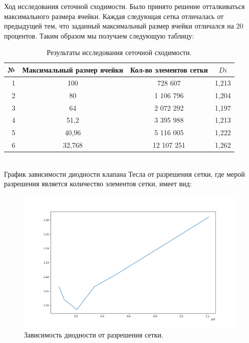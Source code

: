 \documentclass[14pt,a4paper]{article}
\begin{document}
        Ход исследования сеточной сходимости. Было принято решение отталкиваться максимального размера ячейки. Каждая следующая сетка отличалась от предыдущей тем, что заданный максимальный размер ячейки отличался на 20 процентов. Таким образом мы получаем следующую таблицу: 
        \\
        \begin{table}[!htb]
            \begin{center}
                \caption{Результаты исследования сеточной сходимости.}
                \begin{tabular}{rccc}                 
                    \hline
                    №      & Максимальный размер ячейки & Кол-во элементов сетки  & $Di$ \\
                    \hline
                    \hline
                    1	& 100		& 728 607		& 1,213		\\
                    2	& 80		& 1 106 796	 	& 1,204		\\
                    3   & 64		& 2 072 292		& 1,197		\\
                    4	& 51,2		& 3 395 988		& 1,213		\\
                    5	& 40,96		& 5 116 005		& 1,222		\\
                    6	& 32,768	& 12 107 251	& 1,262		\\
                    \hline                   
                \end{tabular}
                \label{tab:tab1} 
            \end{center}
        \end{table}
        \\
        
        График зависимости диодности клапана Тесла от разрешения сетки, где мерой разрешения является количество элементов сетки, имеет вид:
        
        \begin{figure}[H]
            \centering
            \includegraphics[width = 1\linewidth]{graphDi1}
            \caption{Зависимость диодности от разрешения сетки.}
            \label{fig:graphDi1}
        \end{figure}
                                    
\end{document}
